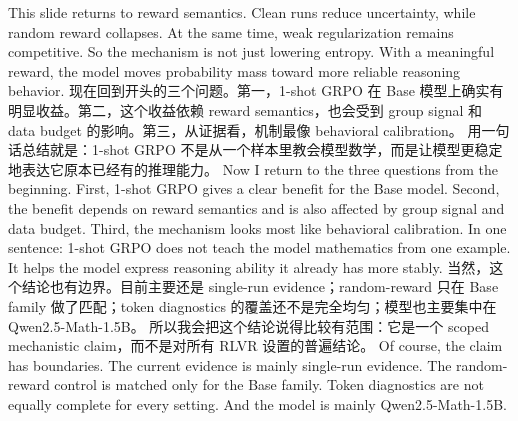 {}\markdownRendererInterblockSeparator
{}This slide returns to reward semantics. Clean runs reduce uncertainty, while random reward collapses.\markdownRendererInterblockSeparator
{}At the same time, weak regularization remains competitive. So the mechanism is not just lowering entropy. With a meaningful reward, the model moves probability mass toward more reliable reasoning behavior.\markdownRendererInterblockSeparator
{}\markdownRendererHorizontalRule{}\markdownRendererInterblockSeparator
{}\markdownRendererInterblockSeparator
{}\markdownRendererInterblockSeparator
{}现在回到开头的三个问题。第一，1-shot GRPO 在 Base 模型上确实有明显收益。第二，这个收益依赖 reward semantics，也会受到 group signal 和 data budget 的影响。第三，从证据看，机制最像 behavioral calibration。\markdownRendererInterblockSeparator
{}用一句话总结就是：1-shot GRPO 不是从一个样本里教会模型数学，而是让模型更稳定地表达它原本已经有的推理能力。\markdownRendererInterblockSeparator
{}\markdownRendererInterblockSeparator
{}Now I return to the three questions from the beginning. First, 1-shot GRPO gives a clear benefit for the Base model. Second, the benefit depends on reward semantics and is also affected by group signal and data budget. Third, the mechanism looks most like behavioral calibration.\markdownRendererInterblockSeparator
{}In one sentence: 1-shot GRPO does not teach the model mathematics from one example. It helps the model express reasoning ability it already has more stably.\markdownRendererInterblockSeparator
{}\markdownRendererHorizontalRule{}\markdownRendererInterblockSeparator
{}\markdownRendererInterblockSeparator
{}\markdownRendererInterblockSeparator
{}当然，这个结论也有边界。目前主要还是 single-run evidence；random-reward 只在 Base family 做了匹配；token diagnostics 的覆盖还不是完全均匀；模型也主要集中在 Qwen2.5-Math-1.5B。\markdownRendererInterblockSeparator
{}所以我会把这个结论说得比较有范围：它是一个 scoped mechanistic claim，而不是对所有 RLVR 设置的普遍结论。\markdownRendererInterblockSeparator
{}\markdownRendererInterblockSeparator
{}Of course, the claim has boundaries. The current evidence is mainly single-run evidence. The random-reward control is matched only for the Base family. Token diagnostics are not equally complete for every setting. And the model is mainly Qwen2.5-Math-1.5B.\markdownRendererInterblockSeparator
